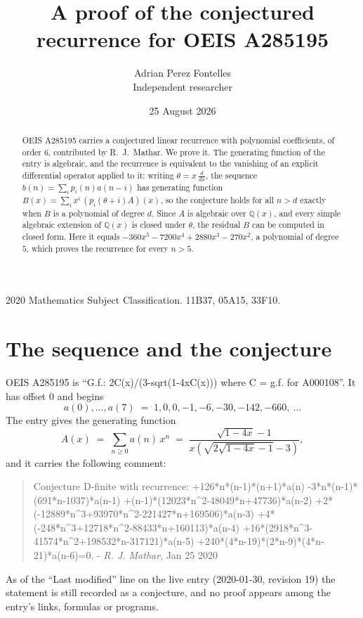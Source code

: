 \documentclass[11pt,a4paper]{article}
\title{A proof of the conjectured recurrence for OEIS A285195}
\author{Adrian Perez Fontelles\\ \small Independent researcher}
\date{25 August 2026}
\theoremstyle{plain}
\theoremstyle{definition}
\begin{document}
\maketitle

\begin{abstract}
OEIS A285195 carries a conjectured linear recurrence with polynomial coefficients, of
order 6, contributed by R.~J.~Mathar. We prove it. The generating function of the
entry is algebraic, and the recurrence is equivalent to the vanishing of an explicit
differential operator applied to it: writing $\theta=x\,\frac{d}{dx}$, the sequence
$b(n)=\sum_{i}p_{i}(n)a(n-i)$ has generating function
$B(x)=\sum_{i}x^{i}\,(p_{i}(\theta+i)A)(x)$, so the conjecture holds for all $n>d$ exactly
when $B$ is a polynomial of degree $d$. Since $A$ is algebraic over $\mathbb{Q}(x)$, and every simple
algebraic extension of $\mathbb{Q}(x)$ is closed under $\theta$, the residual $B$ can be
computed in closed form. Here it equals $- 360 x^{5} - 7200 x^{4} + 2880 x^{3} - 270 x^{2}$, a polynomial of degree $5$, which proves
the recurrence for every $n>5$.
\end{abstract}

\noindent\small 2020 Mathematics Subject Classification. 11B37, 05A15, 33F10.\normalsize

\section{The sequence and the conjecture}

OEIS A285195 is ``G.f.: 2C(x)/(3-sqrt(1-4xC(x))) where C = g.f. for A000108''. It has offset $0$ and begins
\[
a(0),\dots,a(7)\;=\;1, 0, 0, -1, -6, -30, -142, -660,\ \dots
\]
The entry gives the generating function
\begin{equation}\label{eq:gf}
A(x)\;=\;\sum_{n\ge 0} a(n)\,x^{n}\;=\;\frac{\sqrt{1 - 4 x} - 1}{x \left(\sqrt{2 \sqrt{1 - 4 x} - 1} - 3\right)} ,
\end{equation}
and it carries the following comment:
\begin{quote}\small
Conjecture D-finite with recurrence: +126*n*(n-1)*(n+1)*a(n) -3*n*(n-1)*(691*n-1037)*a(n-1) +(n-1)*(12023*n\^{}2-48049*n+47736)*a(n-2) +2*(-12889*n\^{}3+93970*n\^{}2-221427*n+169506)*a(n-3) +4*(-248*n\^{}3+12718*n\^{}2-88433*n+160113)*a(n-4) +16*(2918*n\^{}3-41574*n\^{}2+198532*n-317121)*a(n-5) +240*(4*n-19)*(2*n-9)*(4*n-21)*a(n-6)=0. - \emph{R. J. Mathar}, Jan 25 2020
\end{quote}
As of the ``Last modified'' line on the live entry (2020-01-30, revision 19) the
statement is still recorded as a conjecture, and no proof appears among the entry's links,
formulas or programs.
\end{document}
